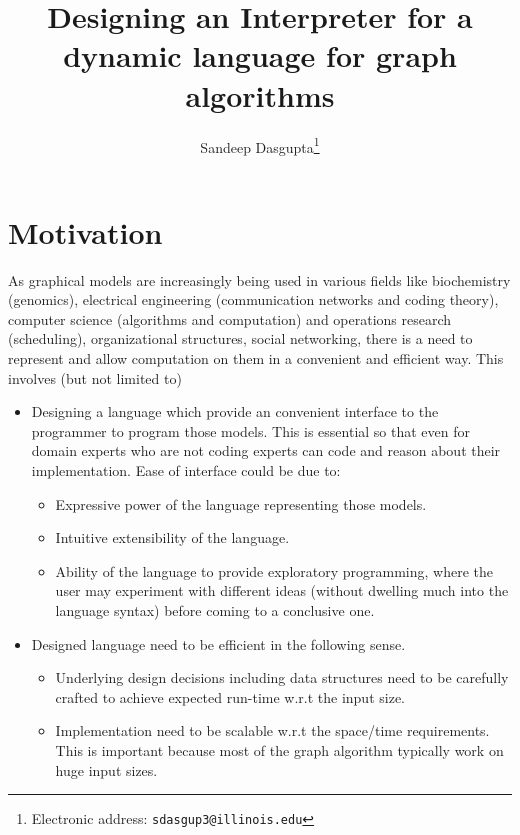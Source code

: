 \documentclass[12,twoside]{article}
\title{\textbf{Designing an Interpreter for a dynamic language for graph algorithms}}
\author{Sandeep Dasgupta\thanks{Electronic address:
\texttt{sdasgup3@illinois.edu}}}
\begin{document}
\begin{titlepage}
\thispagestyle{empty}
\maketitle
\pagebreak
\end{titlepage}


\section{Motivation}

As graphical models are increasingly being used in various
  fields like biochemistry (genomics), electrical engineering (communication
      networks and coding theory), computer science (algorithms and
        computation) and operations research (scheduling), organizational
      structures, social networking, there is a need to represent and allow
      computation on them in a convenient and efficient way. This involves (but not limited
          to)

    \begin{itemize}
      \item Designing a language which provide an convenient interface to the programmer to program those models.
        This is essential so that even for domain experts who are not coding experts can code and reason about
        their implementation.
        Ease of interface could be due to:
        \begin{itemize}
          \item Expressive power of the language representing those models.
          \item Intuitive extensibility of the language.
          \item Ability of the language to provide exploratory programming, where the user
          may experiment with different ideas (without dwelling much into the language syntax) before coming to a conclusive one.
        \end{itemize}
     \item Designed language need to be efficient in the following sense.     
        \begin{itemize}
          \item Underlying design decisions including data structures need to be carefully crafted 
            to achieve expected run-time w.r.t the input size.
          \item Implementation need to be scalable w.r.t the space/time requirements. This is 
          important because most of the graph algorithm typically work
          on huge input sizes.
        \end{itemize}
   \end{itemize}       
\end{document}
